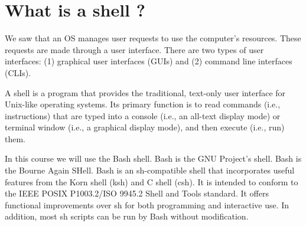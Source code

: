 \documentclass[11pt]{article}
\begin{document}
\section{What is a shell ?}

We saw that an OS manages user requests to use the computer's resources. These requests are made through a user interface. There are two types of user interfaces: (1) graphical user interfaces (GUIs) and (2) command line interfaces (CLIs).

A shell is a program that provides the traditional, text-only user interface for Unix-like operating systems. Its primary function is to read commands (i.e., instructions) that are typed into a console (i.e., an all-text display mode) or terminal window (i.e., a graphical display mode), and then execute (i.e., run) them.

In this course we will use the Bash shell. Bash is the GNU Project's shell. Bash is the Bourne Again SHell. Bash is an sh-compatible shell that incorporates useful features from the Korn shell (ksh) and C shell (csh). It is intended to conform to the IEEE POSIX P1003.2/ISO 9945.2 Shell and Tools standard. It offers functional improvements over sh for both programming and interactive use. In addition, most sh scripts can be run by Bash without modification.
\end{document}
